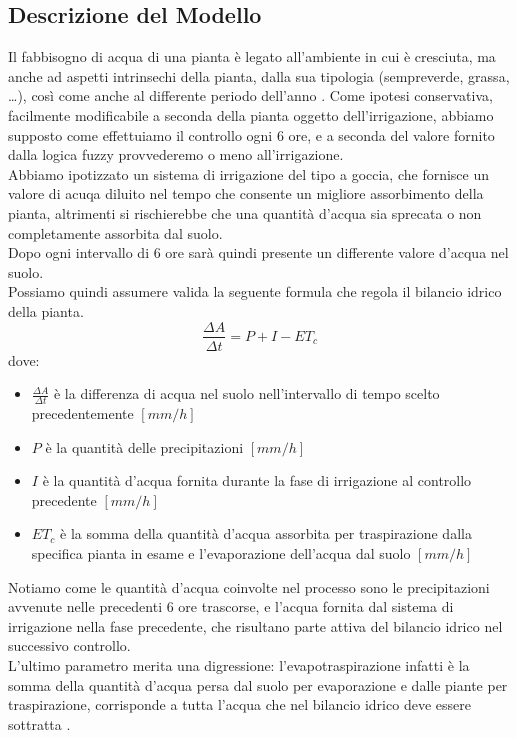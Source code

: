 \documentclass[conference,10pt]{IEEEtran}
\begin{document}
\subsection{Descrizione del Modello}\label{sec:symo}
Il fabbisogno di acqua di una pianta è legato all'ambiente in cui è cresciuta, ma anche ad aspetti intrinsechi della pianta, dalla sua tipologia (sempreverde, grassa, \dots), così come anche al differente periodo dell'anno \cite{3}.
Come ipotesi conservativa, facilmente modificabile a seconda della pianta oggetto dell'irrigazione, abbiamo supposto come effettuiamo il controllo ogni 6 ore, e a seconda del valore fornito dalla logica fuzzy provvederemo o meno all'irrigazione.\\
Abbiamo ipotizzato un sistema di irrigazione del tipo a goccia, che fornisce un valore di acuqa diluito nel tempo che consente un migliore assorbimento della pianta, altrimenti si rischierebbe che una quantità d'acqua sia sprecata o non completamente assorbita dal suolo.\\
Dopo ogni intervallo di 6 ore sarà quindi presente un differente valore d'acqua nel suolo.\\ Possiamo quindi assumere valida la seguente formula che regola il bilancio idrico della pianta.
\begin{equation*}
\frac{\Delta A}{\Delta t} = P + I - ET_c
\end{equation*}
dove:
\begin{itemize}
	\item $\frac{\Delta A}{\Delta t}$ è la differenza di acqua nel suolo nell'intervallo di tempo scelto precedentemente $[mm/h]$
	\item $P$ è la quantità delle precipitazioni $[mm/h]$ 
	\item $I$ è la quantità d'acqua fornita durante la fase di irrigazione al controllo precedente $[mm/h]$
	\item $ET_c$ è la somma della quantità d'acqua assorbita per traspirazione dalla specifica pianta in esame e l'evaporazione dell'acqua dal suolo $[mm/h]$
	\newline
\end{itemize}
Notiamo come le quantità d'acqua coinvolte nel processo sono le precipitazioni avvenute nelle precedenti 6 ore trascorse, e l'acqua fornita dal sistema di irrigazione nella fase precedente, che risultano parte attiva del bilancio idrico nel successivo controllo.\\
L'ultimo parametro merita una digressione: l'evapotraspirazione infatti è la somma della quantità d’acqua persa dal suolo per evaporazione e dalle piante per traspirazione, corrisponde a tutta l'acqua che nel bilancio idrico deve essere sottratta \cite{6}. \\
\end{document}
